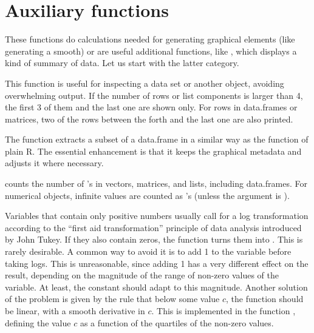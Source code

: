 \documentclass[11pt]{article}\usepackage[]{graphicx}\usepackage[]{color}
\begin{document}
\section{Auxiliary functions}
These functions do calculations needed for generating graphical elements
(like generating a smooth) or are useful additional functions,
like , which displays a kind of summary of data.
Let us start with the latter category.

This function is useful for inspecting a data set or another object, 
avoiding overwhelming output. 
If the number of rows or list components is larger than 4,
the first 3 of them and the last one are shown only.
For rows in data.frames or matrices, two of the rows between the forth and
the last one are also printed.

The function  extracts a subset of a data.frame in a similar way
as the  function of plain R.
The essential enhancement is that it keeps the graphical metadata and 
adjusts it where necessary.


 counts the number of 's in vectors, matrices, and lists, 
including data.frames. 
For numerical objects, infinite values are counted as 's 
(unless the argument  is ).

Variables that contain only positive numbers usually call for a 
log transformation according to the ``first aid transformation'' principle
of data analysis introduced by John Tukey.
If they also contain zeros, the  function turns them into .
This is rarely desirable. 
A common way to avoid it is to add 1 to the variable before taking logs.
This is unreasonable, since adding 1 has a very different effect on the
result, depending on the magnitude of the range of non-zero values of the
variable. At least, the constant should adapt to this magnitude.
Another solution of the problem is given by the rule that below some
value $c$, the function should be linear, with a smooth derivative in $c$.
This is implemented in the function , defining the value $c$
as a function of the quartiles of the non-zero values.
\end{document}
